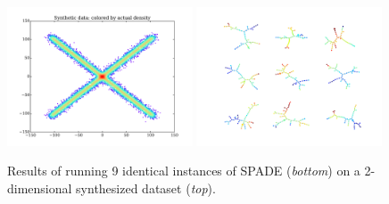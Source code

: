 \documentclass{article}
\begin{document}



\begin{figure}
\begin{center}
\includegraphics[width = 0.49\textwidth]{figures/synthetic_data.pdf}
\includegraphics[width = 0.49\textwidth]{figures/spade_multiview.pdf}
\caption{Results of running 9 identical instances of SPADE (\textit{bottom}) on a 2-dimensional synthesized dataset (\textit{top}). }
\label{fig:spade_analysis}
\end{center}
\end{figure}


\end{document}
